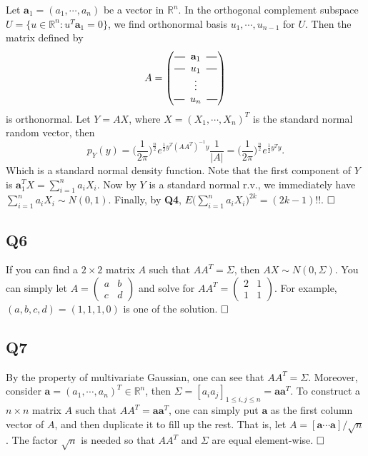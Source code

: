 \documentclass[12pt]{article}
\begin{document}
Let $\mathbf{a}_1=(a_1,\cdots,a_n)$ be a vector in $\mathbb{R}^n$. In the orthogonal complement subspace $U=\{u\in\mathbb{R}^n:u^T\mathbf{a}_1=0\}$, we find orthonormal basis $u_1,\cdots,u_{n-1}$ for $U$. Then the matrix defined by
\begin{equation*}
A=
\begin{pmatrix}
\horzbar\;\;\mathbf{a}_1\;\;\horzbar
\\
\horzbar\;\;u_1\;\;\horzbar\\
\vdots \\
\horzbar\;\; u_n\;\;\horzbar
\end{pmatrix}
\end{equation*}
is orthonormal. Let $Y=AX$, where $X=(X_1,\cdots,X_n)^T$ is the standard normal random vector, then
\begin{equation*}
p_Y(y)=\Big(\frac{1}{2\pi}\Big)^\frac{n}{2}e^{\frac{1}{2}y^T(AA^T)^{-1}y}\frac{1}{|A|}=\Big(\frac{1}{2\pi}\Big)^\frac{n}{2}e^{\frac{1}{2}y^Ty}.
\end{equation*}
Which is a standard normal density function. Note that the first component of $Y$ is $\mathbf{a}_1^TX=\sum_{i=1}^na_iX_i$. Now by $Y$ is a standard normal r.v., we immediately have $\sum_{i=1}^na_iX_i\sim N(0,1)$. Finally, by \textbf{Q4}, $E\big(\sum_{i=1}^na_iX_i\big)^{2k}=(2k-1)!!$.
$\hspace{\fill}\square$

\subsection*{Q6}
If you can find a $2\times 2$ matrix $A$ such that $AA^T=\Sigma$, then $AX\sim N(0,\Sigma)$. You can simply let $A=
\begin{pmatrix}
a & b\\
c & d
\end{pmatrix}
$ and solve for $AA^T=
\begin{pmatrix}
2 & 1\\
1 & 1
\end{pmatrix}
$. For example, $(a,b,c,d)=(1,1,1,0)$ is one of the solution.
$\hspace{\fill}\square$

\subsection*{Q7}
By the property of multivariate Gaussian, one can see that $AA^T=\Sigma$. Moreover, consider $\mathbf{a}=(a_1,\cdots,a_n)^T\in\mathbb{R}^n$, then $\Sigma=[a_ia_j]_{1\leq i,j\leq n}=\mathbf{a}\mathbf{a}^T$. To construct a $n\times n$ matrix $A$ such that $AA^T=\mathbf{a}\mathbf{a}^T$, one can simply put $\mathbf{a}$ as the first column vector of $A$, and then duplicate it to fill up the rest. That is, let $A=\left[\mathbf{a}\cdots\mathbf{a}\right]/\sqrt{n}$. The factor $\sqrt{n}$ is needed so that $AA^T$ and $\Sigma$ are equal element-wise.
$\hspace{\fill}\square$
\end{document}
